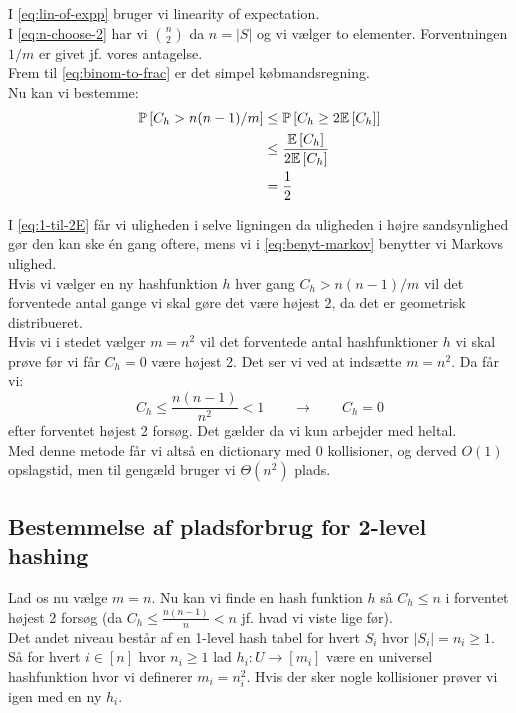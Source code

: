 I \cref{eq:lin-of-expp} bruger vi linearity of expectation.\\
I \cref{eq:n-choose-2} har vi $\binom{n}{2}$ da $n = |S|$ og vi vælger to elementer. Forventningen $1/m$ er givet jf. vores antagelse.\\
Frem til \cref{eq:binom-to-frac} er det simpel købmandsregning.\\


Nu kan vi bestemme:
\begin{align}
  \mathbb{P} \left[  C_h > n(n-1)/m  \right]
  &\leq \mathbb{P} \left[  C_h \geq 2 \mathbb{E} \left[  C_h  \right]  \right] \label{eq:1-til-2E} \\
  &\leq \frac{\mathbb{E} \left[  C_h  \right]}{2 \mathbb{E} \left[  C_h  \right]} \label{eq:benyt-markov} \\
  &= \frac{1}{2} \nonumber
\end{align}

I \cref{eq:1-til-2E} får vi uligheden i selve ligningen da uligheden i højre sandsynlighed gør den kan ske én gang oftere, mens vi i \cref{eq:benyt-markov} benytter vi Markovs ulighed.\\

Hvis vi vælger en ny hashfunktion $h$ hver gang $C_h > n(n-1)/m$ vil det forventede antal gange vi skal gøre det være højest $2$, da det er geometrisk distribueret.\\


Hvis vi i stedet vælger $m = n^2$ vil det forventede antal hashfunktioner $h$ vi skal prøve før vi får $C_h = 0$ være højest 2. Det ser vi ved at indsætte $m = n^2$. Da får vi:
$$
C_h \leq \frac{n(n-1)}{n^2} < 1
\quad\quad \rightarrow \quad\quad
C_h = 0
$$
efter forventet højest 2 forsøg. Det gælder da vi kun arbejder med heltal.\\

Med denne metode får vi altså en dictionary med 0 kollisioner, og derved $O(1)$ opslagstid, men til gengæld bruger vi $\Theta(n^2)$ plads.


\subsection{Bestemmelse af pladsforbrug for 2-level hashing}
Lad os nu vælge $m = n$. Nu kan vi finde en hash funktion $h$ så $C_h \leq n$ i forventet højest 2 forsøg (da $C_h \leq \frac{n(n-1)}{n} < n$ jf. hvad vi viste lige før).\\

Det andet niveau består af en 1-level hash tabel for hvert $S_i$ hvor $|S_i| = n_i \geq 1$. Så for hvert $i \in [n]$ hvor $n_i \geq 1$ lad $h_i : U \rightarrow [m_i]$ være en universel hashfunktion hvor vi definerer $m_i = n_i^2$. Hvis der sker nogle kollisioner prøver vi igen med en ny $h_i$.


%


